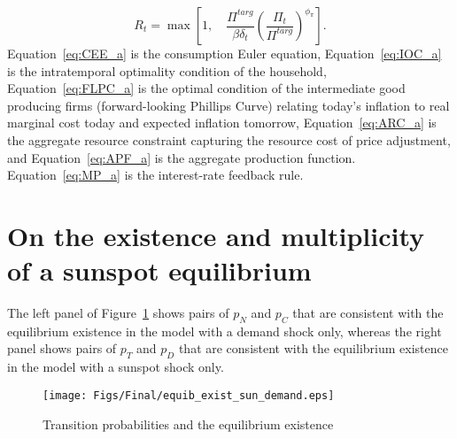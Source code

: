 \documentclass[11pt]{article}
\begin{document}
\begin{singlespace}
		\begin{equation}
			R_{t} = \max \left[1, \quad\frac{\Pi^{targ}}{\beta\delta_t}\left(\frac{\Pi_{t}}{\Pi^{targ}}\right)^{\phi_{\pi}}\right]. \label{eq:MP_a}
		\end{equation}
		\normalsize{Equation~\ref{eq:CEE_a} is the consumption Euler equation, Equation~\ref{eq:IOC_a} is the intratemporal optimality condition of the household, Equation~\ref{eq:FLPC_a} is the optimal condition of the intermediate good producing firms (forward-looking Phillips Curve) relating today's inflation to real marginal cost today and expected inflation tomorrow, Equation~\ref{eq:ARC_a} is the aggregate resource constraint capturing the resource cost of price adjustment, and Equation~\ref{eq:APF_a} is the aggregate production function. Equation~\ref{eq:MP_a} is the interest-rate feedback rule.}
		
		
		\section{On the existence and multiplicity of a sunspot equilibrium}
		\label{A:Existence}
				
		The left panel of Figure~\ref{fig:Existence} shows pairs of $p_{N}$ and $p_{C}$ that are consistent with the equilibrium existence in the model with a demand shock only, whereas the right panel shows pairs of $p_{T}$ and $p_{D}$ that are consistent with the equilibrium existence in the model with a sunspot shock only.
		
		\begin{figure}[!ht]
			\begin{center}
				\caption{Transition probabilities and the equilibrium existence\label{fig:Existence}}
				\texttt{[image: Figs/Final/equib\_exist\_sun\_demand.eps]}\\
			\end{center}
		\end{figure}
		

\end{singlespace}
\end{document}
